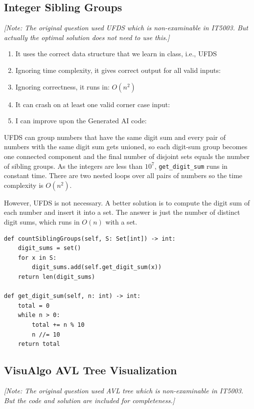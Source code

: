 \documentclass[12pt]{article}
\renewcommand{\t}{\texttt}
\begin{document}
\subsection{Integer Sibling Groups}
\textit{[Note: The original question used UFDS which is non-examinable in IT5003. But actually the optimal solution does not need to use this.]}

\begin{enumerate}
\item It uses the correct data structure that we learn in class, i.e., UFDS 
\item Ignoring time complexity, it gives correct output for all valid inputs: 
\item Ignoring correctness, it runs in: $\boxed{O\left(n^2\right)}$
\item It can crash on at least one valid corner case input: 
\item I can improve upon the Generated AI code: 
\end{enumerate}

UFDS can group numbers that have the same digit sum and every pair of numbers with the same digit sum gets unioned, so each digit-sum group becomes one connected component and the final number of disjoint sets equals the number of sibling groups. As the integers are less than $10^7$, \t{get\_digit\_sum} runs in constant time. There are two nested loops over all pairs of numbers so the time complexity is $O\left(n^2\right)$.

However, UFDS is not necessary. A better solution is to compute the digit sum of each number and insert it into a set. The answer is just the number of distinct digit sums, which runs in $O(n)$ with a set.

\begin{verbatim}
def countSiblingGroups(self, S: Set[int]) -> int:
    digit_sums = set()
    for x in S:
        digit_sums.add(self.get_digit_sum(x))
    return len(digit_sums)

def get_digit_sum(self, n: int) -> int:
    total = 0
    while n > 0:
        total += n % 10
        n //= 10
    return total
\end{verbatim}
\newpage
\subsection{VisuAlgo AVL Tree Visualization}
\textit{[Note: The original question used AVL tree which is non-examinable in IT5003. But the code and solution are included for completeness.]}
\end{document}

